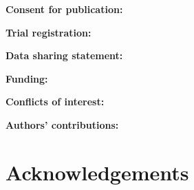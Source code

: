 \documentclass[11pt,a4paper]{article}
\begin{document}
\noindent\textbf{Consent for publication:} %

\noindent\textbf{Trial registration:} %

\noindent\textbf{Data sharing statement:} %

\noindent\textbf{Funding:} %

\noindent\textbf{Conflicts of interest:} %

\noindent\textbf{Authors' contributions:} %

\section*{Acknowledgements}



\end{document}
